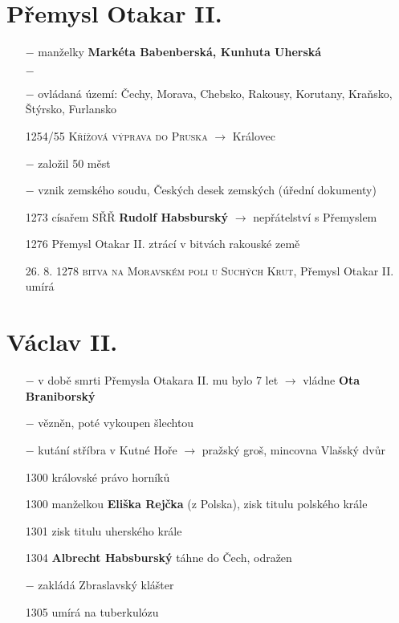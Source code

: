 \documentclass{article}
\begin{document}
\section*{Přemysl Otakar II.}
\begin{itemize}
    \vspace{-0.5em}
    \setlength\itemsep{0.15em}
    \item[$-$] manželky \textbf{Markéta Babenberská, Kunhuta Uherská}
    \item[$-$] 
    \item[$-$] ovládaná území: Čechy, Morava, Chebsko, Rakousy, Korutany, Kraňsko, Štýrsko, Furlansko
    \item[1254/55] \textsc{Křížová výprava do Pruska} $\rightarrow$ Královec
    \item[$-$] založil 50 měst
    \item[$-$] vznik zemského soudu, Českých desek zemských (úřední dokumenty)
    \item[1273] císařem SŘŘ \textbf{Rudolf Habsburský} $\rightarrow$ nepřátelství s Přemyslem
    \item[1276] Přemysl Otakar II. ztrácí v bitvách rakouské země
    \item[26. 8. 1278] \textsc{bitva na Moravském poli u Suchých Krut}, Přemysl Otakar II. umírá
\end{itemize}

\section*{Václav II.}
\begin{itemize}
    \vspace{-0.5em}
    \setlength\itemsep{0.15em}
    \item[$-$] v době smrti Přemysla Otakara II. mu bylo 7 let $\rightarrow$ vládne \textbf{Ota Braniborský}
    \item[$-$] vězněn, poté vykoupen šlechtou
    \item[$-$] kutání stříbra v Kutné Hoře $\rightarrow$  pražský groš, mincovna Vlašský dvůr
    \item[1300] královské právo horníků
    \item[1300] manželkou \textbf{Eliška Rejčka} (z Polska), zisk titulu polského krále
    \item[1301] zisk titulu uherského krále
    \item[1304] \textbf{Albrecht Habsburský} táhne do Čech, odražen
    \item[$-$] zakládá Zbraslavský klášter
    \item[1305] umírá na tuberkulózu
\end{itemize}
\end{document}
